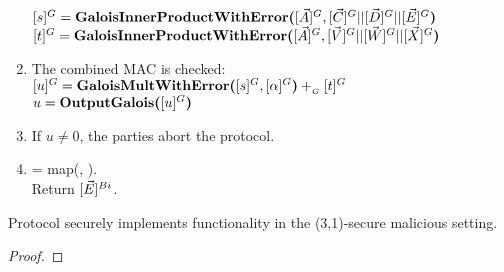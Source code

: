 \begin{protocol}[Shuffle]
\begin{enumerate}
			$[s]^{G} = 
				\textbf{GaloisInnerProductWithError(}[\vec{A}]^{G}, [\vec{C}]^{G} || [\vec{D}]^{G}|| [\vec{E}]^{G}\textbf{)}$\\
			$[t]^{G} = \textbf{GaloisInnerProductWithError(}[\vec{A}]^{G}, [\vec{V}]^{G} || [\vec{W}]^{G} || [\vec{X}]^{G}\textbf{)}$
		\item The combined MAC is checked:\\
			$[u]^{G} = \textbf{GaloisMultWithError(}[s]^{G}, [\alpha]^{G}\textbf{)} +_{_G} [t]^{G}$\\
			$u = \textbf{OutputGalois(}[u]^{G}\textbf{)}$
		\item If $u \neq 0$, the parties abort the protocol.
		\item {} = map(\BitArrtoInt{\GalToBoolArr{\cdot}}, ).\\
			Return $[\vec{E}]^{Bi}$.
	\end{enumerate}
\end{protocol}


\begin{theorem}
	Protocol \Shuffle{} securely implements functionality \Shuffle
	in the (3,1)-secure malicious setting.
\end{theorem}
\begin{proof}
	

\end{proof}

